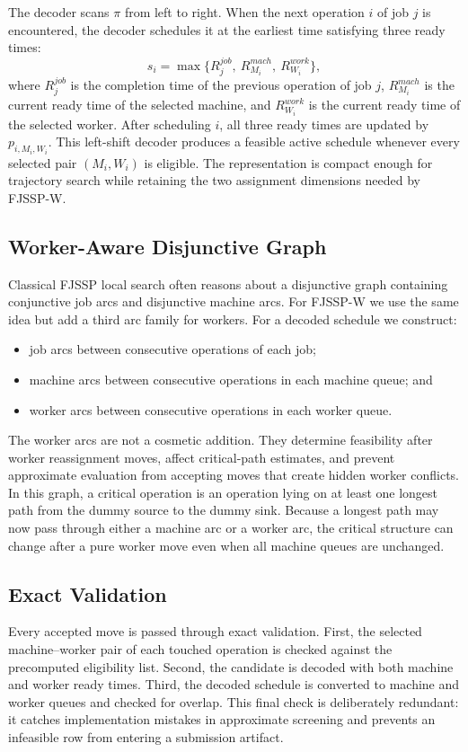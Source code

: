 \documentclass[sigconf,anonymous,review,dvipsnames]{acmart}
\begin{document}
The decoder scans $\pi$ from left to right.
When the next operation $i$ of job $j$ is encountered, the decoder schedules it at the earliest time satisfying three ready times:
\[
  s_i=\max\{R^{job}_j,\ R^{mach}_{M_i},\ R^{work}_{W_i}\},
\]
where $R^{job}_j$ is the completion time of the previous operation of job $j$, $R^{mach}_{M_i}$ is the current ready time of the selected machine, and $R^{work}_{W_i}$ is the current ready time of the selected worker.
After scheduling $i$, all three ready times are updated by $p_{i,M_i,W_i}$.
This left-shift decoder produces a feasible active schedule whenever every selected pair $(M_i,W_i)$ is eligible.
The representation is compact enough for trajectory search while retaining the two assignment dimensions needed by FJSSP-W.

\subsection{Worker-Aware Disjunctive Graph}
Classical FJSSP local search often reasons about a disjunctive graph containing conjunctive job arcs and disjunctive machine arcs.
For FJSSP-W we use the same idea but add a third arc family for workers.
For a decoded schedule we construct:
\begin{itemize}
  \item job arcs between consecutive operations of each job;
  \item machine arcs between consecutive operations in each machine queue; and
  \item worker arcs between consecutive operations in each worker queue.
\end{itemize}
The worker arcs are not a cosmetic addition.
They determine feasibility after worker reassignment moves, affect critical-path estimates, and prevent approximate evaluation from accepting moves that create hidden worker conflicts.
In this graph, a critical operation is an operation lying on at least one longest path from the dummy source to the dummy sink.
Because a longest path may now pass through either a machine arc or a worker arc, the critical structure can change after a pure worker move even when all machine queues are unchanged.

\subsection{Exact Validation}
Every accepted move is passed through exact validation.
First, the selected machine--worker pair of each touched operation is checked against the precomputed eligibility list.
Second, the candidate is decoded with both machine and worker ready times.
Third, the decoded schedule is converted to machine and worker queues and checked for overlap.
This final check is deliberately redundant: it catches implementation mistakes in approximate screening and prevents an infeasible row from entering a submission artifact.
\end{document}
